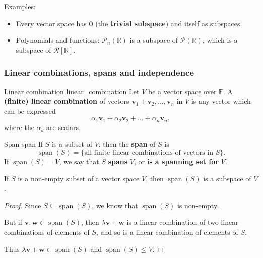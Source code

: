 Examples:
\begin{itemize}
	\item Every vector space has ${\mathbf{0}}$ (the \textbf{trivial subspace}) and itself as subspaces.
	\item Polynomials and functions: $\mathcal{P}_n(\mathbb{R})$ is a subspace of $\mathcal{P}(\mathbb{R})$, which is a subspace of $\mathcal{R}[\mathbb{R}]$.
\end{itemize}

\subsubsection{Linear combinations, spans and independence}

\begin{definition}{Linear combination \cite{math2601_notes}}{linear_combination}
Let $V$ be a vector space over $\mathbb{F}$. A \textbf{(finite) linear combination} of vectors $\mathbf{v}_1 + \mathbf{v}_2, \ldots, \mathbf{v}_n$ in $V$ is any vector which can be expressed
$$ \alpha_1 \mathbf{v}_1 + \alpha_2 \mathbf{v}_2 + \dots + \alpha_n \mathbf{v}_n , $$
where the $\alpha_k$ are scalars.
\end{definition}

\begin{definition}{Span \cite{math2601_notes}}{span}
If $S$ is a subset of $V$, then the \textbf{span} of $S$ is
$$ \operatorname{span}(S) = \{ \text{all finite linear combinations of vectors in } S \} . $$
If $\operatorname{span}(S) = V$, we say that $S$ \textbf{spans} $V$, or \textbf{is a spanning set for} $V$.
\end{definition}

\begin{lemma}{\cite{math2601_notes}}{}
If $S$ is a non-empty subset of a vector space $V$, then $\operatorname{span}(S)$ is a subspace of $V$.

\begin{proof}
Since $S \subseteq \operatorname{span}(S)$, we know that $\operatorname{span}(S)$ is non-empty.

But if $\mathbf{v}, \mathbf{w} \in \operatorname{span}(S)$, then $\lambda \mathbf{v} + \mathbf{w}$ is a linear combination of two linear combinations of elements of $S$, and so is a linear combination of elements of $S$.

Thus $\lambda \mathbf{v} + \mathbf{w} \in \operatorname{span}(S)$ and $\operatorname{span}(S) \leq V$.
\end{proof}
\end{lemma}

